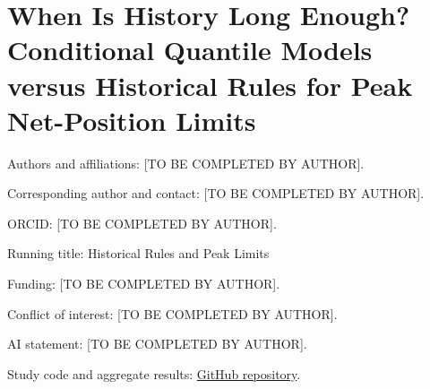 \documentclass[11pt,a4paper]{article}
\begin{document}
\section*{When Is History Long Enough? Conditional Quantile Models versus Historical Rules for Peak Net-Position Limits}
Authors and affiliations: [TO BE COMPLETED BY AUTHOR].\par\medskip
Corresponding author and contact: [TO BE COMPLETED BY AUTHOR].\par\medskip
ORCID: [TO BE COMPLETED BY AUTHOR].\par\medskip
Running title: Historical Rules and Peak Limits\par\medskip
Funding: [TO BE COMPLETED BY AUTHOR].\par\medskip
Conflict of interest: [TO BE COMPLETED BY AUTHOR].\par\medskip
AI statement: [TO BE COMPLETED BY AUTHOR].\par\medskip
Study code and aggregate results: \href{https://github.com/ByronLi0207/financial-mathematics-paper-20261020/tree/revision-v9}{GitHub repository}.\par\medskip
\end{document}
